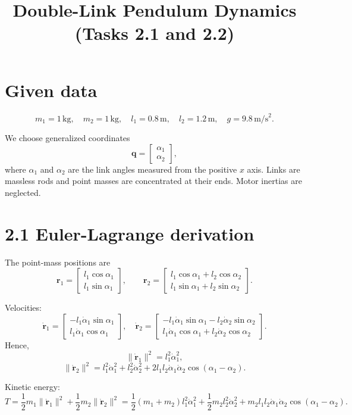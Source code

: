 \documentclass[12pt]{article}
\title{Double-Link Pendulum Dynamics (Tasks 2.1 and 2.2)}
\author{}
\date{}
\begin{document}
\maketitle

\section*{Given data}
\[
m_1 = 1\,\text{kg},\quad m_2 = 1\,\text{kg},\quad
l_1 = 0.8\,\text{m},\quad l_2 = 1.2\,\text{m},\quad
g = 9.8\,\text{m/s}^2.
\]

We choose generalized coordinates
\[
\bm q = \begin{bmatrix}\alpha_1 \\ \alpha_2\end{bmatrix},
\]
where $\alpha_1$ and $\alpha_2$ are the link angles measured from the positive $x$ axis.
Links are massless rods and point masses are concentrated at their ends. Motor inertias are neglected.

\section*{2.1 Euler-Lagrange derivation}
The point-mass positions are
\[
\bm r_1 =
\begin{bmatrix}
l_1\cos\alpha_1 \\
l_1\sin\alpha_1
\end{bmatrix},
\qquad
\bm r_2 =
\begin{bmatrix}
l_1\cos\alpha_1 + l_2\cos\alpha_2 \\
l_1\sin\alpha_1 + l_2\sin\alpha_2
\end{bmatrix}.
\]

Velocities:
\[
\dot{\bm r}_1 =
\begin{bmatrix}
-l_1\dot\alpha_1\sin\alpha_1 \\
l_1\dot\alpha_1\cos\alpha_1
\end{bmatrix},
\quad
\dot{\bm r}_2 =
\begin{bmatrix}
-l_1\dot\alpha_1\sin\alpha_1 - l_2\dot\alpha_2\sin\alpha_2 \\
l_1\dot\alpha_1\cos\alpha_1 + l_2\dot\alpha_2\cos\alpha_2
\end{bmatrix}.
\]
Hence,
\[
\|\dot{\bm r}_1\|^2 = l_1^2\dot\alpha_1^2,
\]
\[
\|\dot{\bm r}_2\|^2 = l_1^2\dot\alpha_1^2 + l_2^2\dot\alpha_2^2
+ 2l_1l_2\dot\alpha_1\dot\alpha_2\cos(\alpha_1-\alpha_2).
\]

Kinetic energy:
\[
T = \frac12 m_1\|\dot{\bm r}_1\|^2 + \frac12 m_2\|\dot{\bm r}_2\|^2
= \frac12 (m_1+m_2)l_1^2\dot\alpha_1^2
+ \frac12 m_2l_2^2\dot\alpha_2^2
+ m_2l_1l_2\dot\alpha_1\dot\alpha_2\cos(\alpha_1-\alpha_2).
\]
\end{document}
